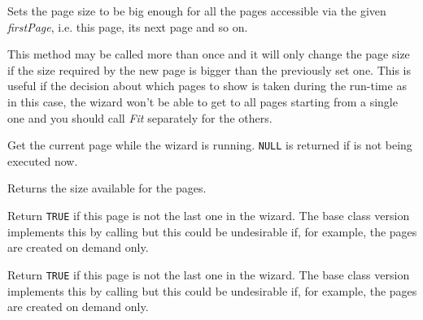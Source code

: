 Sets the page size to be big enough for all the pages accessible via the
given {\it firstPage}, i.e. this page, its next page and so on.

This method may be called more than once and it will only change the page size
if the size required by the new page is bigger than the previously set one.
This is useful if the decision about which pages to show is taken during the
run-time as in this case, the wizard won't be able to get to all pages starting
from a single one and you should call {\it Fit} separately for the others.

\label{wxwizardgetcurrentpage}


Get the current page while the wizard is running. {\tt NULL} is returned if 
 is not being executed now.

\label{wxwizardgetpagesize}


Returns the size available for the pages.

\label{wxwizardhasnextpage}


Return {\tt TRUE} if this page is not the last one in the wizard. The base
class version implements this by calling 
 but this could be undesirable if,
for example, the pages are created on demand only.



\label{wxwizardhasprevpage}


Return {\tt TRUE} if this page is not the last one in the wizard. The base
class version implements this by calling 
 but this could be undesirable if,
for example, the pages are created on demand only.



\label{wxwizardrunwizard}

